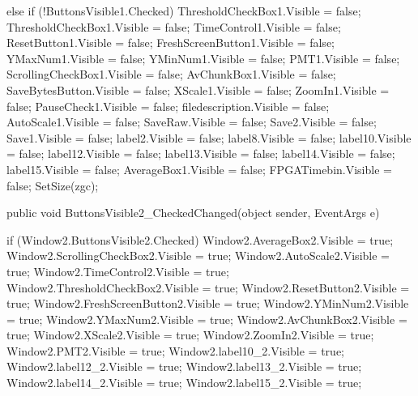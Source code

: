 {{{{            }

            else if (!ButtonsVisible1.Checked)
            {
                ThresholdCheckBox1.Visible = false;
                ThresholdCheckBox1.Visible = false;
                TimeControl1.Visible = false;
                ResetButton1.Visible = false;
                FreshScreenButton1.Visible = false;
                YMaxNum1.Visible = false;
                YMinNum1.Visible = false;
                PMT1.Visible = false;
                ScrollingCheckBox1.Visible = false;
                AvChunkBox1.Visible = false;
                SaveBytesButton.Visible = false;
                XScale1.Visible = false;
                ZoomIn1.Visible = false;
                PauseCheck1.Visible = false;
                filedescription.Visible = false;
                AutoScale1.Visible = false;
                SaveRaw.Visible = false;
                Save2.Visible = false;
                Save1.Visible = false;
                label2.Visible = false;
                label8.Visible = false;
                label10.Visible = false;
                label12.Visible = false;
                label13.Visible = false;
                label14.Visible = false;
                label15.Visible = false;
                AverageBox1.Visible = false;
                FPGATimebin.Visible = false;
            }
            SetSize(zgc);
        }
        public void ButtonsVisible2_CheckedChanged(object sender, EventArgs e)
        {
            if (Window2.ButtonsVisible2.Checked)
            {
                Window2.AverageBox2.Visible = true;
                Window2.ScrollingCheckBox2.Visible = true;
                Window2.AutoScale2.Visible = true;
                Window2.TimeControl2.Visible = true;
                Window2.ThresholdCheckBox2.Visible = true;
                Window2.ResetButton2.Visible = true;
                Window2.FreshScreenButton2.Visible = true;
                Window2.YMinNum2.Visible = true;
                Window2.YMaxNum2.Visible = true;
                Window2.AvChunkBox2.Visible = true;
                Window2.XScale2.Visible = true;
                Window2.ZoomIn2.Visible = true;
                Window2.PMT2.Visible = true;
                Window2.label10_2.Visible = true;
                Window2.label12_2.Visible = true;
                Window2.label13_2.Visible = true;
                Window2.label14_2.Visible = true;
                Window2.label15_2.Visible = true;
            }

}}}
